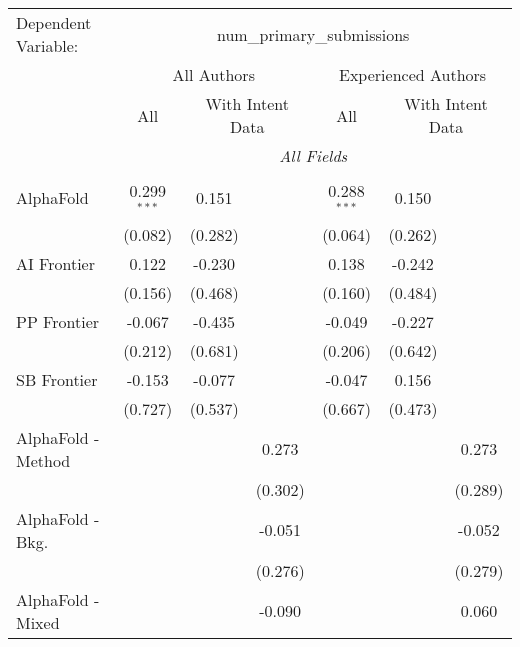 \begingroup
\centering
\begin{tabular}{lcccccc}
   \tabularnewline \midrule \midrule
   Dependent Variable: & \multicolumn{6}{c}{num\_primary\_submissions}\\
 & \multicolumn{3}{c}{All Authors} & \multicolumn{3}{c}{Experienced Authors} \\
\cmidrule(lr){2-4} \cmidrule(lr){5-7}
 & \multicolumn{1}{c}{All} & \multicolumn{2}{c}{With Intent Data} & \multicolumn{1}{c}{All} & \multicolumn{2}{c}{With Intent Data} \\
\cmidrule(lr){2-2} \cmidrule(lr){3-4} \cmidrule(lr){5-5} \cmidrule(lr){6-7}
 & \multicolumn{6}{c}{\textit{All Fields}} \\ \\
   AlphaFold            & 0.299$^{***}$ & 0.151   &               & 0.288$^{***}$ & 0.150   &   \\   
                        & (0.082)       & (0.282) &               & (0.064)       & (0.262) &   \\   
   AI Frontier          & 0.122         & -0.230  &               & 0.138         & -0.242  &   \\   
                        & (0.156)       & (0.468) &               & (0.160)       & (0.484) &   \\   
   PP Frontier          & -0.067        & -0.435  &               & -0.049        & -0.227  &   \\   
                        & (0.212)       & (0.681) &               & (0.206)       & (0.642) &   \\   
   SB Frontier          & -0.153        & -0.077  &               & -0.047        & 0.156   &   \\   
                        & (0.727)       & (0.537) &               & (0.667)       & (0.473) &   \\   
   AlphaFold - Method   &               &         & 0.273         &               &         & 0.273\\   
                        &               &         & (0.302)       &               &         & (0.289)\\   
   AlphaFold - Bkg.     &               &         & -0.051        &               &         & -0.052\\   
                        &               &         & (0.276)       &               &         & (0.279)\\   
   AlphaFold - Mixed    &               &         & -0.090        &               &         & 0.060\\   

\end{tabular}
